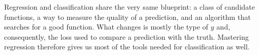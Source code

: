 \begin{remark}
Regression and classification share the very same blueprint: a class of
candidate functions, a way to measure the quality of a prediction, and an
algorithm that searches for a good function. What changes is mostly the type of
$y$ and, consequently, the loss used to compare a prediction with the truth.
Mastering regression therefore gives us most of the tools needed for
classification as well.
\end{remark}
